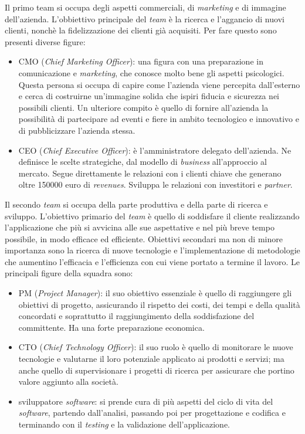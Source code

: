 Il primo team si occupa degli aspetti commerciali, di \textit{marketing} e di immagine dell'azienda. L'obbiettivo principale del \textit{team} \`e la ricerca e l'aggancio di nuovi clienti, nonch\`e la fidelizzazione dei clienti gi\`a acquisiti. Per fare questo sono presenti diverse figure:
\begin{itemize}
	\item CMO (\textit{Chief Marketing Officer}): una figura con una preparazione in comunicazione e \textit{marketing}, che conosce molto bene gli aspetti psicologici. Questa persona si occupa di capire come l'azienda viene percepita dall'esterno e cerca di costruirne un'immagine solida che ispiri fiducia e sicurezza nei possibili clienti. Un ulteriore compito \`e quello di fornire all'azienda la possibilit\`a di partecipare ad eventi e fiere in ambito tecnologico e innovativo e di pubblicizzare l'azienda stessa.
	\item CEO (\textit{Chief Executive Officer}): \`e l'amministratore delegato dell'azienda. Ne definisce le scelte strategiche, dal modello di \textit{business\gloss} all'approccio al mercato. Segue direttamente le relazioni con i clienti chiave che generano oltre 150000 euro di \textit{revenues\gloss}. Sviluppa le relazioni con investitori e \textit{partner}.
\end{itemize}

Il secondo \textit{team} si occupa della parte produttiva e della parte di ricerca e sviluppo. L'obiettivo primario del \textit{team} \`e quello di soddisfare il cliente realizzando l'applicazione che pi\`u si avvicina alle sue aspettative e nel pi\`u breve tempo possibile, in modo efficace ed efficiente. Obiettivi secondari ma non di minore importanza sono la ricerca di nuove tecnologie e l'implementazione di metodologie che aumentino l'efficacia e l'efficienza con cui viene portato a termine il lavoro.
Le principali figure della squadra sono:
\begin{itemize}
	\item PM (\textit{Project Manager}): il suo obiettivo essenziale è quello di raggiungere gli obiettivi di progetto, assicurando il rispetto dei costi, dei tempi e della qualità concordati e soprattutto il raggiungimento della soddisfazione del committente. Ha una forte preparazione economica.
	\item CTO (\textit{Chief Technology Officer}): il suo ruolo \`e quello di monitorare le nuove tecnologie e valutarne il loro potenziale applicato ai prodotti e servizi; ma anche quello di supervisionare i progetti di ricerca per assicurare che portino valore aggiunto alla societ\`a.
	\item sviluppatore \textit{software\gloss}:  si prende cura di pi\`u aspetti del ciclo di vita del \textit{software\gloss}, partendo dall'analisi, passando poi per progettazione e codifica e terminando con il \textit{testing} e la validazione dell'applicazione. 
\end{itemize} 

